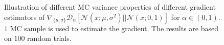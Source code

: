 \documentclass[letterpaper]{article} %
\newcommand{\Nc}[0]{\ensuremath{\mathcal{N}} }
\newcommand{\Dc}[0]{\ensuremath{\mathcal{D}} }
\begin{document}
\begin{figure}[tb]
	\centering	
	\caption{Illustration of different MC variance properties of different gradient estimators of $\nabla_{\{\mu,\sigma\}}\Dc_{\alpha}[\Nc(x;\mu,\sigma^2)||\Nc(x;0,1)]$ for $\alpha \in (0,1)$. 
		$1$ MC sample is used to estimate the gradient. The results are based on $100$ random trials. } \label{fig:alpha_grad_var}
\end{figure}
\end{document}
